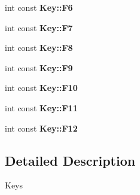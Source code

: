 \begin{DoxyCompactItemize}
\item 
\hypertarget{group__group12_ga16949ba7bd28d03b288286786f47da2f}{
int const {\bfseries Key::F6}}
\label{group__group12_ga16949ba7bd28d03b288286786f47da2f}

\item 
\hypertarget{group__group12_gace41caca76f3d8d554ec1b039fbf3f76}{
int const {\bfseries Key::F7}}
\label{group__group12_gace41caca76f3d8d554ec1b039fbf3f76}

\item 
\hypertarget{group__group12_gaf9e7ff8a44a64a5507a4fc06f7fd4ee2}{
int const {\bfseries Key::F8}}
\label{group__group12_gaf9e7ff8a44a64a5507a4fc06f7fd4ee2}

\item 
\hypertarget{group__group12_ga68ac93381ba2b32f8679deb9fff8fff3}{
int const {\bfseries Key::F9}}
\label{group__group12_ga68ac93381ba2b32f8679deb9fff8fff3}

\item 
\hypertarget{group__group12_gade873a7768f616f8de2301a8286f380f}{
int const {\bfseries Key::F10}}
\label{group__group12_gade873a7768f616f8de2301a8286f380f}

\item 
\hypertarget{group__group12_ga0815c903a15744ca2aa4be622098c869}{
int const {\bfseries Key::F11}}
\label{group__group12_ga0815c903a15744ca2aa4be622098c869}

\item 
\hypertarget{group__group12_ga91c0243c487026282a1bd5a05585967a}{
int const {\bfseries Key::F12}}
\label{group__group12_ga91c0243c487026282a1bd5a05585967a}

\end{DoxyCompactItemize}


\subsection{Detailed Description}
Keys 